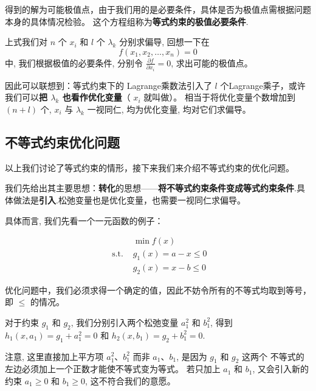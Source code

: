 得到的解为可能极值点，由于我们用的是必要条件，具体是否为极值点需根据问题本身的具体情况检验。 这个方程组称为\textbf{等式约束的极值必要条件}.

上式我们对 $ n $ 个 $ x_{i} $ 和 $ l $ 个 $ \lambda_{k} $ 分别求偏导, 回想一下在 
$$ f\left(x_{1}, x_{2}, \ldots, x_{n}\right)=0 $$ 
中, 我们根据极值的必要条件, 分别令 $ \frac{\partial f}{\partial x_{i}}=0 $, 求出可能的极值点。 

因此可以联想到：等式约束下的 Lagrange乘数法引入了 $ l $ 个Lagrange乘子，或许我们可以\textbf{把 $ \lambda_{k} $ 也看作优化变量}（ $ x_{i} $ 就叫做）。 相当于将优化变量个数增加到 $ (n+l) $ 个, $ x_{i} $ 与 $ \lambda_{k} $ 一视同仁, 均为优化变量, 均对它们求偏导。

\subsection{不等式约束优化问题}

以上我们讨论了等式约束的情形，接下来我们来介绍不等式约束的优化问题。

我们先给出其主要思想：\textbf{转化}的思想——\textbf{将不等式约束条件变成等式约束条件}.具体做法是\textbf{引入}.松弛变量也是优化变量，也需要一视同仁求偏导。

具体而言, 我们先看一个一元函数的例子：

\begin{example}
    $$\begin{aligned}
        &\min f(x)\\
    \text { s.t. }& g_{1}(x)=a-x \leq 0\\
    &g_{2}(x)=x-b \leq 0
    \end{aligned} $$
\end{example}

\begin{remark}
    优化问题中，我们必须求得一个确定的值，因此不妨令所有的不等式均取到等号，即 $ \leq $ 的情况。
\end{remark}


对于约束 $ g_{1} $ 和 $ g_{2} $, 我们分别引入两个松弛变量 $ a_{1}^{2} $ 和 $ b_{1}^{2} $, 得到 $ h_{1}\left(x, a_{1}\right)=g_{1}+a_{1}^{2}=0 $ 和 $ h_{2}\left(x, b_{1}\right)=g_{2}+b_{1}^{2}=0 $. 

\begin{remark}
    注意, 这里直接加上平方项 $ a_{1}^{2} 、 b_{1}^{2} $ 而非 $ a_{1} 、 b_{1} $, 是因为 $ g_{1} $ 和 $ g_{2} $ 这两个 不等式的左边必须加上一个正数才能使不等式变为等式。 若只加上 $ a_{1} $ 和 $ b_{1} $, 又会引入新的约束 $ a_{1} \geq 0 $ 和 $ b_{1} \geq 0 $, 这不符合我们的意愿。
\end{remark}


